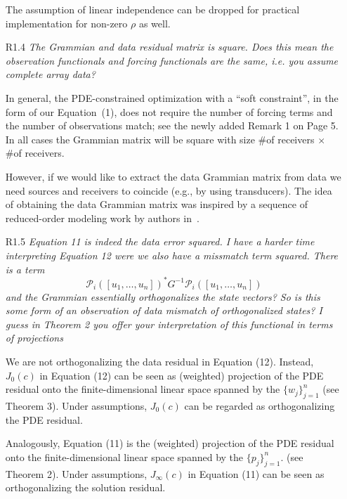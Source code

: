 \documentclass[11pt]{article}
\newcommand{\mycomment}[1]{\textit{\color{bluey}#1}}
\begin{document}
\begin{enumerate}[parsep=1em,leftmargin=1em]
The assumption of linear independence can be dropped for practical implementation for non-zero $\rho$ as well.



\item[R1.4] \mycomment{The Grammian and data residual matrix is square. Does this mean the observation functionals and forcing
functionals are the same, i.e. you assume complete array data?}


In general, the PDE-constrained optimization with a ``soft constraint'', in the form of our Equation~(1), does not require the number of forcing terms and the number of observations match; see the newly added Remark 1 on Page 5. In all cases the Grammian matrix will be square with size \#of receivers $\times$ \#of receivers. 

However, if we would like to extract the data Grammian matrix from data we need sources and receivers to coincide (e.g., by using transducers). The idea of obtaining the data Grammian matrix was inspired by a sequence of reduced-order modeling work by authors in~\cite{Borcea2018,Borcea2020,borcea2022waveform}. 







\item[R1.5] \mycomment{Equation 11 is indeed the data error squared. I have a harder time interpreting Equation 12 were we also have
a missmatch term squared. There is a term
\[
\mathcal{P}_i\left([u_1,\ldots, u_n]\right)^* G^{-1} \mathcal{P}_i\left([u_1,\ldots, u_n]\right)
\]
and the Grammian essentially orthogonalizes the state vectors? So is this some form of an observation of data mismatch of orthogonalized states? I guess in Theorem 2 you offer your interpretation of this functional in terms of projections}


We are not orthogonalizing the data residual in Equation (12). Instead, $J_0(c)$ in Equation (12) can be seen as (weighted) projection of  the PDE residual onto the finite-dimensional linear space spanned by the $\{w_j\}_{j=1}^n$ (see Theorem 3). Under assumptions, $J_0(c)$ can be regarded as orthogonalizing the PDE residual. 

Analogously, Equation (11) is the (weighted) projection of  the PDE residual onto the finite-dimensional linear space spanned by the $\{p_j\}_{j=1}^n$. (see Theorem 2). Under assumptions, $J_\infty(c)$ in Equation (11) can be seen as orthogonalizing the solution residual. 


\end{enumerate}
\end{document}
